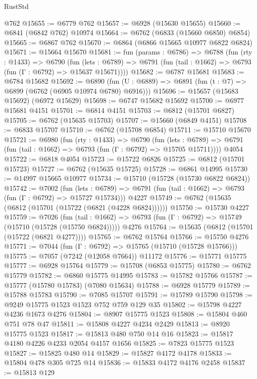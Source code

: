 \begin{lexlean}{RustStd}
\begin{coremodule}
    @762
@15655 := @6779 @762
@15657 := @6928 (@15630 @15655)
@15660 := @6841 (@6842 @762) @10974
@15664 := @6762 (@6833 (@15660 @6850) @6854)
@15665 := @6867 @762
@15670 := @6864 (@6866 @15665 @10977 @6822 @6824)
@15671 := @15664 @15670
@15681 := fun (params : @6786) =>
  @6788
    (fun (rty : @1433) =>
    @6790
      (fun (lets : @6789) =>
      @6791 (fun (tail : @1662) => @6793 (fun (Γ : @6792) => @15637 @15671))))
@15682 := @6787 @15681
@15683 := @6784 @15682
@15692 := @6890
    (fun (U : @6889) => @6891 (fun (t : @7) => @6899 (@6762 (@6905 @10974 @6780) @6916)))
@15696 := @15657 (@15683 @15692) (@6972 @15629)
@15698 := @6747 @15682 @15692
@15700 := @6977 @15681 @4151
@15701 := @6814 @4151
@15703 := @6812 (@15701 @6827)
@15705 := @6762 (@15635 @15703)
@15707 := @15660 (@6849 @4151)
@15708 := @6833 @15707
@15710 := @6762 (@15708 @6854)
@15711 := @15710 @15670
@15721 := @6980
    (fun (rty : @1433) =>
    @6790
      (fun (lets : @6789) =>
      @6791 (fun (tail : @1662) => @6793 (fun (Γ : @6792) => @15705 @15711))))
    @4054
@15722 := @6818 @4054
@15723 := @15722 @6826
@15725 := @6812 (@15701 @15723)
@15727 := @6762 (@15635 @15725)
@15728 := @6861 @14995
@15730 := @14997 @15665 @10977
@15734 := @15710 (@15728 (@15730 @6822 @6824))
@15742 := @7002
    (fun (lets : @6789) => @6791 (fun (tail : @1662) => @6793 (fun (Γ : @6792) => @15727 @15734)))
    @4227
@15749 := @6762 (@15635 (@6812 (@15701 (@15722 (@6821 (@4228 @6824))))))
@15750 := @15730 @4227
@15759 := @7026
    (fun (tail : @1662) => @6793 (fun (Γ : @6792) => @15749 (@15710 (@15728 (@15750 @6824)))))
    @4276
@15764 := @15635 (@6812 (@15701 (@15722 (@6821 @4277))))
@15765 := @6762 @15764
@15766 := @15750 @4276
@15771 := @7044 (fun (Γ : @6792) => @15765 (@15710 (@15728 @15766)))
@15775 := @7057 (@7242 (@12058 @7664)) @11172
@15776 := @15771 @15775
@15777 := @6928 @15764
@15779 := @15708 (@6853 @15775)
@15780 := @6762 @15779
@15782 := @6860 @15775 @14995
@15783 := @15782 @15766
@15787 := @15777 (@15780 @15783) (@7080 @15634)
@15788 := @6928 @15779
@15789 := @15788 @15783
@15790 := @7085 @15707
@15791 := @15789 @15790
@15798 := @9249 @15775 @1523 @1523 @752 @759 @129 @35
@15802 := @15798 @4227 @4236 @1673 @4276
@15804 := @8907 @15775 @1523
@15808 := @15804 @460 @751 @78 @47
@15811 := @15808 @4227 @4234 @2429
@15813 := @8920 @15775 @1523
@15817 := @15813 @480 @750 @14 @16
@15823 := @15817 @4180 @4226 @4233 @2054 @4157 @1656
@15825 := @7823 @15775 @1523
@15827 := @15825 @480 @14
@15829 := @15827 @4172 @4178
@15833 := @15804 @478 @305 @725 @14
@15836 := @15833 @4172 @4176 @2458
@15837 := @15813 @129

\end{coremodule}
\end{lexlean}
